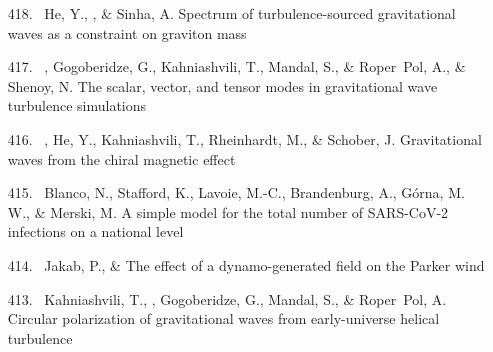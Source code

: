 \begin{itemize}
\item[{418.}~]
He, Y., \Brandenburg, \& Sinha, A.
{Spectrum of turbulence-sourced gravitational waves as a constraint on graviton mass}

\item[{417.}~]
\Brandenburg, Gogoberidze, G., Kahniashvili, T., Mandal, S., \& Roper~Pol, A., \& Shenoy, N.
{The scalar, vector, and tensor modes in gravitational wave turbulence simulations}

\item[{416.}~]
\Brandenburg, He, Y., Kahniashvili, T., Rheinhardt, M., \& Schober, J.
{Gravitational waves from the chiral magnetic effect}

\item[{415.}~]
Blanco, N., Stafford, K., Lavoie, M.-C., Brandenburg, A., G{\'o}rna, M. W., \& Merski, M.
{A simple model for the total number of SARS-CoV-2 infections on a national level}

\item[{414.}~]
Jakab, P., \& \Brandenburg{}
{The effect of a dynamo-generated field on the Parker wind}

\item[{413.}~]
Kahniashvili, T., \Brandenburg, Gogoberidze, G., Mandal, S., \& Roper~Pol, A.
{Circular polarization of gravitational waves from early-universe helical turbulence}


\end{itemize}
